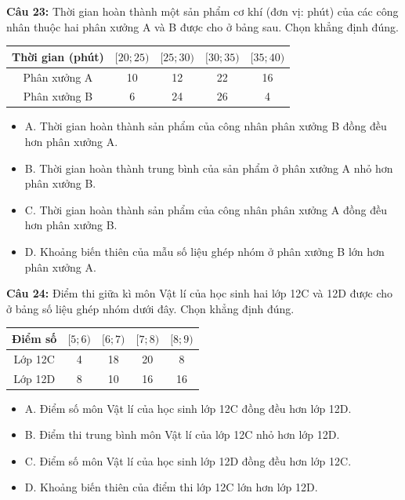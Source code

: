 \documentclass[12pt]{article}
\begin{document}
	\noindent \textbf{Câu 23:} Thời gian hoàn thành một sản phẩm cơ khí (đơn vị: phút) của các công nhân thuộc hai phân xưởng A và B được cho ở bảng sau. Chọn khẳng định đúng.
	\begin{center}
		\renewcommand{\arraystretch}{1.3}
		\begin{tabular}{|c|c|c|c|c|}
			\hline
			Thời gian (phút) & $[20; 25)$ & $[25; 30)$ & $[30; 35)$ & $[35; 40)$ \\
			\hline
			Phân xưởng A & 10 & 12 & 22 & 16 \\
			\hline
			Phân xưởng B & 6 & 24 & 26 & 4 \\
			\hline
		\end{tabular}
	\end{center}
	\begin{itemize}[label=, leftmargin=*]
		\item A. Thời gian hoàn thành sản phẩm của công nhân phân xưởng B đồng đều hơn phân xưởng A.
		\item B. Thời gian hoàn thành trung bình của sản phẩm ở phân xưởng A nhỏ hơn phân xưởng B.
		\item C. Thời gian hoàn thành sản phẩm của công nhân phân xưởng A đồng đều hơn phân xưởng B.
		\item D. Khoảng biến thiên của mẫu số liệu ghép nhóm ở phân xưởng B lớn hơn phân xưởng A.
	\end{itemize}
	
	\vspace{4mm}
	
	\noindent \textbf{Câu 24:} Điểm thi giữa kì môn Vật lí của học sinh hai lớp 12C và 12D được cho ở bảng số liệu ghép nhóm dưới đây. Chọn khẳng định đúng.
	\begin{center}
		\renewcommand{\arraystretch}{1.3}
		\begin{tabular}{|c|c|c|c|c|}
			\hline
			Điểm số & $[5; 6)$ & $[6; 7)$ & $[7; 8)$ & $[8; 9)$ \\
			\hline
			Lớp 12C & 4 & 18 & 20 & 8 \\
			\hline
			Lớp 12D & 8 & 10 & 16 & 16 \\
			\hline
		\end{tabular}
	\end{center}
	\begin{itemize}[label=, leftmargin=*]
		\item A. Điểm số môn Vật lí của học sinh lớp 12C đồng đều hơn lớp 12D.
		\item B. Điểm thi trung bình môn Vật lí của lớp 12C nhỏ hơn lớp 12D.
		\item C. Điểm số môn Vật lí của học sinh lớp 12D đồng đều hơn lớp 12C.
		\item D. Khoảng biến thiên của điểm thi lớp 12C lớn hơn lớp 12D.
	\end{itemize}
	
\end{document}
